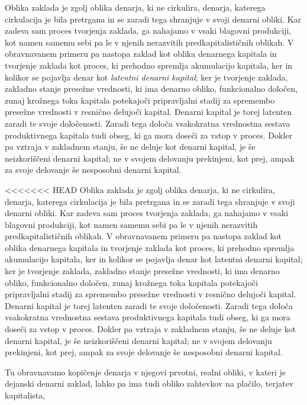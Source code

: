 \documentclass[kapital_02.tex]{subfiles}
\begin{document}
Oblika zaklada je zgolj oblika denarja, ki ne cirkulira, denarja, katerega cirkulacija je bila pretrgana in se zaradi tega shranjuje v svoji denarni obliki. Kar zadeva sam proces tvorjenja zaklada, ga nahajamo v vsaki blagovni produkciji, kot namen samemu sebi pa le v njenih nerazvitih predkapitalističnih oblikah. V obravnavanem primeru pa nastopa zaklad kot oblika denarnega kapitala in tvorjenje zaklada kot proces, ki prehodno spremlja akumulacijo kapitala, ker in kolikor se pojavlja denar kot \emph{latentni denarni kapital}; ker je tvorjenje zaklada, zakladno stanje presežne vrednosti, ki ima denarno obliko, funkcionalno določen, zunaj krožnega toka kapitala potekajoči pripravljalni stadij za spremembo presežne vrednosti v resnično delujoči kapital. Denarni kapital je torej latenten zaradi te svoje določenosti. Zaradi tega določa vsakokratna vrednostna sestava produktivnega kapitala tudi obseg, ki ga mora doseči za vstop v proces. Dokler pa vztraja v zakladnem stanju, še ne deluje kot denarni kapital, je še neizkoriščeni denarni kapital; ne v svojem delovanju prekinjeni, kot prej, ampak za svoje delovanje še nesposobni denarni kapital.

<<<<<<< HEAD
Oblika zaklada je zgolj oblika denarja, ki ne cirkulira, denarja, katerega cirkulacija je bila pretrgana in se zaradi tega shranjuje v svoji denarni obliki. Kar zadeva sam proces tvorjenja zaklada, ga nahajamo v vsaki blagovni produkciji, kot namen samemu sebi pa le v njenih nerazvitih predkapitalističnih oblikah. V obravnavanem primeru pa nastopa zaklad kot oblika denarnega kapitala in tvorjenje zaklada kot proces, ki prehodno spremlja akumulacijo kapitala, ker in kolikor se pojavlja denar kot latentni denarni kapital; ker je tvorjenje zaklada, zakladno stanje presežne vrednosti, ki ima denarno obliko, funkcionalno določen, zunaj krožnega toka kapitala potekajoči pripravljalni stadij za spremembo presežne vrednosti v resnično delujoči kapital. Denarni kapital je torej latenten zaradi te svoje določenosti. Zaradi tega določa vsakokratna vrednostna sestava produktivnega kapitala tudi obseg, ki ga mora doseči za vstop v proces. Dokler pa vztraja v zakladnem stanju, še ne deluje kot denarni kapital, je še neizkoriščeni denarni kapital; ne v svojem delovanju prekinjeni, kot prej, ampak za svoje delovanje še nesposobni denarni kapital.

Tu obravnavamo kopičenje denarja v njegovi prvotni, realni obliki, v kateri je dejanski denarni zaklad, lahko pa ima tudi obliko zahtevkov na plačilo, terjatev kapitalista,
\end{document}
